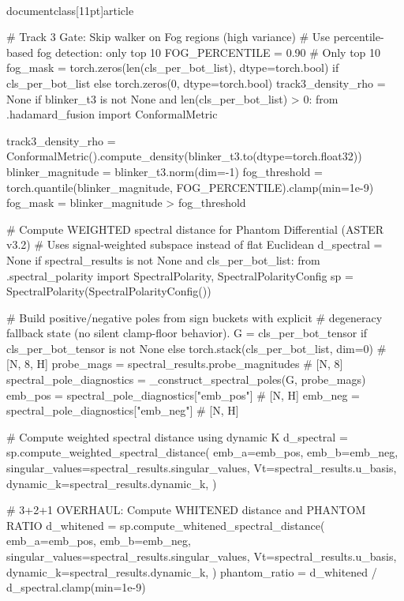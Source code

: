 \\documentclass[11pt]{article}
\begin{document}
\begin{CodeBlock}
                # Track 3 Gate: Skip walker on Fog regions (high variance)
                # Use percentile-based fog detection: only top 10%
                FOG_PERCENTILE = 0.90  # Only top 10%
                fog_mask = torch.zeros(len(cls_per_bot_list), dtype=torch.bool) if cls_per_bot_list else torch.zeros(0, dtype=torch.bool)
                track3_density_rho = None
                if blinker_t3 is not None and len(cls_per_bot_list) > 0:
                    from .hadamard_fusion import ConformalMetric

                    track3_density_rho = ConformalMetric().compute_density(blinker_t3.to(dtype=torch.float32))
                    blinker_magnitude = blinker_t3.norm(dim=-1)
                    fog_threshold = torch.quantile(blinker_magnitude, FOG_PERCENTILE).clamp(min=1e-9)
                    fog_mask = blinker_magnitude > fog_threshold

                # Compute WEIGHTED spectral distance for Phantom Differential (ASTER v3.2)
                # Uses signal-weighted subspace instead of flat Euclidean
                d_spectral = None
                if spectral_results is not None and cls_per_bot_list:
                    from .spectral_polarity import SpectralPolarity, SpectralPolarityConfig
                    sp = SpectralPolarity(SpectralPolarityConfig())

                    # Build positive/negative poles from sign buckets with explicit
                    # degeneracy fallback state (no silent clamp-floor behavior).
                    G = cls_per_bot_tensor if cls_per_bot_tensor is not None else torch.stack(cls_per_bot_list, dim=0)  # [N, 8, H]
                    probe_mags = spectral_results.probe_magnitudes  # [N, 8]
                    spectral_pole_diagnostics = _construct_spectral_poles(G, probe_mags)
                    emb_pos = spectral_pole_diagnostics["emb_pos"]  # [N, H]
                    emb_neg = spectral_pole_diagnostics["emb_neg"]  # [N, H]

                    # Compute weighted spectral distance using dynamic K
                    d_spectral = sp.compute_weighted_spectral_distance(
                        emb_a=emb_pos,
                        emb_b=emb_neg,
                        singular_values=spectral_results.singular_values,
                        Vt=spectral_results.u_basis,
                        dynamic_k=spectral_results.dynamic_k,
                    )
                    
                    # 3+2+1 OVERHAUL: Compute WHITENED distance and PHANTOM RATIO
                    d_whitened = sp.compute_whitened_spectral_distance(
                        emb_a=emb_pos,
                        emb_b=emb_neg,
                        singular_values=spectral_results.singular_values,
                        Vt=spectral_results.u_basis,
                        dynamic_k=spectral_results.dynamic_k,
                    )
                    phantom_ratio = d_whitened / d_spectral.clamp(min=1e-9)


\end{CodeBlock}
\end{document}

